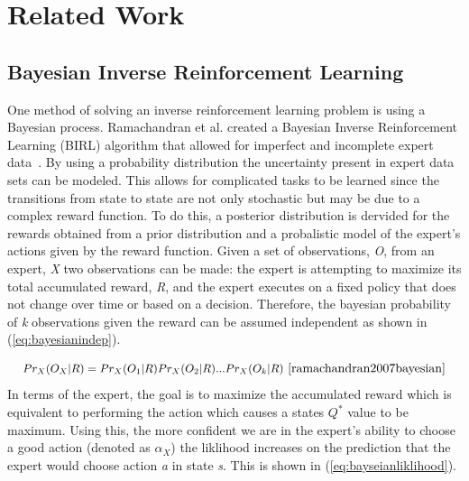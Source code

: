 \documentclass[12pt,american]{report}
\begin{document}
\section{Related Work}
\subsection{Bayesian Inverse Reinforcement Learning}
One method of solving an inverse reinforcement learning problem is using a Bayesian process. Ramachandran et al. created a Bayesian Inverse Reinforcement Learning (BIRL) algorithm that allowed for imperfect and incomplete expert data~\cite{ramachandran2007bayesian}.  By using a probability distribution the uncertainty present in expert data sets can be modeled. This allows for complicated tasks to be learned since the transitions from state to state are not only stochastic but may be due to a complex reward function. To do this, a posterior distribution is dervided for the rewards obtained from a prior distribution and a probalistic model of the expert's actions given by the reward function.  Given a set of observations, \textit{O}, from an expert, \textit{X} two observations can be made: the expert is attempting to maximize its total accumulated reward, \textit{R}, and the expert executes on a fixed policy that does not change over time or based on a decision. Therefore, the bayesian probability of \textit{k} observations given the reward can be assumed independent as shown in (\ref{eq:bayesianindep}).

\begin{equation}
            \label{eq:bayesianindep}
            \resizebox{0.60\textwidth}{!}{$Pr_X(O_X|R) = Pr_X(O_1|R)Pr_X(O_2|R)...Pr_X(O_k|R)$}~\cite{ramachandran2007bayesian}%
        \end{equation}
In terms of the expert, the goal is to maximize the accumulated reward which is equivalent to performing the action which causes a states \textit{$Q^*$} value to be maximum. Using this, the more confident we are in the expert's ability to choose a good action (denoted as $\alpha_X$) the liklihood increases on the prediction that the expert would choose action \textit{a} in state \textit{s}.  This is shown in (\ref{eq:bayseianliklihood}).
\end{document}
